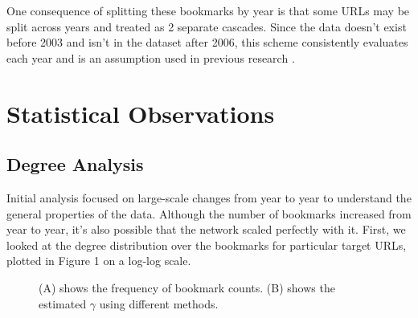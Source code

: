 \documentclass[11pt]{amsart}
\begin{document}
One consequence of splitting these bookmarks by year is that some URLs may be split across years and treated as 2 separate cascades. Since the data doesn't exist before 2003 and isn't in the dataset after 2006, this scheme consistently evaluates each year and is an assumption used in previous research \cite{bursty-original}.

\section{Statistical Observations}
\subsection{Degree Analysis}
Initial analysis focused on large-scale changes from year to year to understand the general properties of the data. Although the number of bookmarks increased from year to year, it's also possible that the network scaled perfectly with it. First, we looked at the degree distribution over the bookmarks for particular target URLs, plotted in Figure 1 on a log-log scale.

\begin{figure}
	\centering
\caption{(A) shows the frequency of bookmark counts. (B) shows the estimated $\gamma$ using different methods.}
\end{figure}
\end{document}
